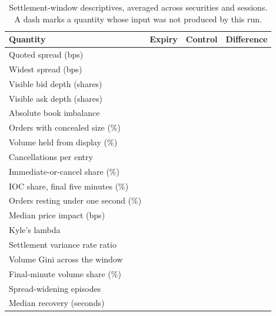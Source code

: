 \documentclass[11pt,a4paper]{article}
\begin{document}
\begin{table}[htbp]
\centering
\caption{Settlement-window descriptives, averaged across securities and sessions. A dash marks a quantity whose input was not produced by this run.}
\label{tab:stylised}
\small
\begin{tabular}{lrrr}
\toprule
Quantity & Expiry & Control & Difference \\
\midrule
Quoted spread (bps) & \SpreadMeanBpsExpiry{} & \SpreadMeanBpsControl{} & \SpreadMeanBpsDiff{} \\
Widest spread (bps) & \SpreadMaxBpsExpiry{} & \SpreadMaxBpsControl{} & \SpreadMaxBpsDiff{} \\
Visible bid depth (shares) & \DepthBidExpiry{} & \DepthBidControl{} & \DepthBidDiff{} \\
Visible ask depth (shares) & \DepthAskExpiry{} & \DepthAskControl{} & \DepthAskDiff{} \\
Absolute book imbalance & \DepthAbsImbalanceExpiry{} & \DepthAbsImbalanceControl{} & \DepthAbsImbalanceDiff{} \\
Orders with concealed size (\%) & \IceRatioExpiry{} & \IceRatioControl{} & \IceRatioDiff{} \\
Volume held from display (\%) & \IceHiddenShareExpiry{} & \IceHiddenShareControl{} & \IceHiddenShareDiff{} \\
Cancellations per entry & \CancelRatioExpiry{} & \CancelRatioControl{} & \CancelRatioDiff{} \\
Immediate-or-cancel share (\%) & \IocRatioExpiry{} & \IocRatioControl{} & \IocRatioDiff{} \\
IOC share, final five minutes (\%) & \IocLateRatioExpiry{} & \IocLateRatioControl{} & \IocLateRatioDiff{} \\
Orders resting under one second (\%) & \LifePhantomRateExpiry{} & \LifePhantomRateControl{} & \LifePhantomRateDiff{} \\
Median price impact (bps) & \ImpactMedianBpsExpiry{} & \ImpactMedianBpsControl{} & \ImpactMedianBpsDiff{} \\
Kyle's lambda & \ImpactKyleLambdaExpiry{} & \ImpactKyleLambdaControl{} & \ImpactKyleLambdaDiff{} \\
Settlement variance rate ratio & \VolRvRatioExpiry{} & \VolRvRatioControl{} & \VolRvRatioDiff{} \\
Volume Gini across the window & \ProfileGiniExpiry{} & \ProfileGiniControl{} & \ProfileGiniDiff{} \\
Final-minute volume share (\%) & \ProfileFinalMinShareExpiry{} & \ProfileFinalMinShareControl{} & \ProfileFinalMinShareDiff{} \\
Spread-widening episodes & \ResilShocksExpiry{} & \ResilShocksControl{} & \ResilShocksDiff{} \\
Median recovery (seconds) & \ResilRecoverySecExpiry{} & \ResilRecoverySecControl{} & \ResilRecoverySecDiff{} \\
\bottomrule
\end{tabular}
\end{table}
\end{document}
